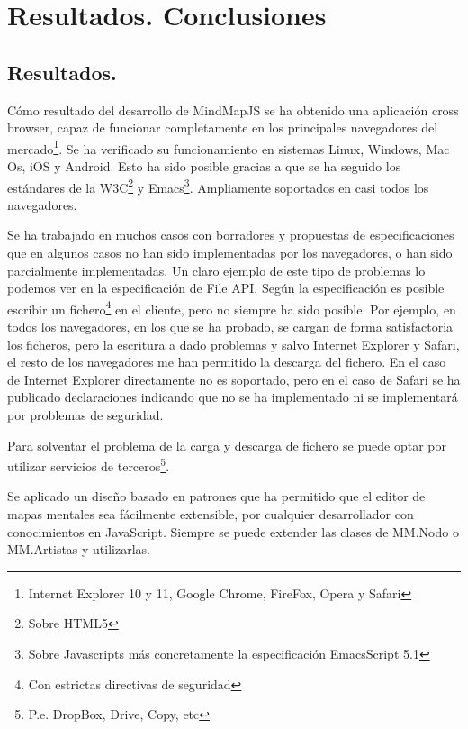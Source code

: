 \newpage\mbox{}\thispagestyle{empty}

\chapter{Resultados. Conclusiones}

\section{Resultados.}


Cómo resultado del desarrollo de MindMapJS se ha obtenido una aplicación cross browser, capaz de funcionar completamente en los principales navegadores del mercado\footnote{Internet Explorer 10 y 11, Google Chrome, FireFox, Opera y Safari}. Se ha verificado su funcionamiento en sistemas Linux, Windows, Mac Os, iOS y Android. Esto ha sido posible gracias a que se ha seguido los estándares de la W3C\footnote{Sobre HTML5} y Emacs\footnote{Sobre Javascripts más concretamente la especificación EmacsScript 5.1}. Ampliamente soportados en casi todos los navegadores. 

Se ha trabajado en muchos casos con borradores y propuestas de especificaciones que en algunos casos no han sido implementadas por los navegadores, o han sido parcialmente implementadas. Un claro ejemplo de este tipo de problemas lo podemos ver en la especificación de File API. Según la especificación es posible escribir un fichero\footnote{Con estrictas directivas de seguridad} en el cliente, pero no siempre ha sido posible. Por ejemplo, en todos los navegadores, en los que se ha probado, se cargan de forma satisfactoria los ficheros, pero la escritura a dado problemas y salvo Internet Explorer y Safari, el resto de los navegadores me han permitido la descarga del fichero. En el caso de Internet Explorer directamente no es soportado, pero en el caso de Safari se ha publicado declaraciones indicando que no se ha implementado ni se implementará por problemas de seguridad. 

Para solventar el problema de la carga y descarga de fichero se puede optar por utilizar servicios de terceros\footnote{P.e. DropBox, Drive, Copy, etc}. 

Se aplicado un diseño basado en patrones que ha permitido que el editor de mapas mentales sea fácilmente extensible, por cualquier desarrollador con conocimientos en JavaScript. Siempre se puede extender las clases de MM.Nodo o MM.Artistas y utilizarlas. 

